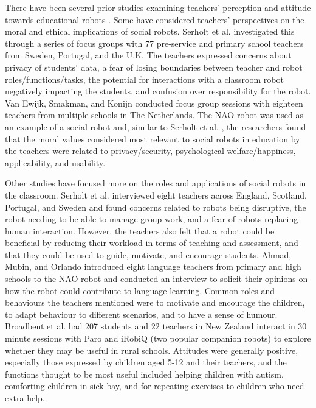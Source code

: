 There have been several prior studies examining teachers' perception and attitude towards educational robots \cite{serholt2014teachers,Broadbent2018,Serholt2017,van2020teachers,Westlund2016,Ahmad2016,chang10}. Some have considered teachers' perspectives on the moral and ethical implications of social robots. Serholt et al. \cite{Serholt2017} investigated this through a series of focus groups with 77 pre-service and primary school teachers from Sweden, Portugal, and the U.K. The teachers expressed concerns about privacy of students' data, a fear of losing boundaries between teacher and robot roles/functions/tasks, the potential for interactions with a classroom robot negatively impacting the students, and confusion over responsibility for the robot. Van Ewijk, Smakman, and Konijn \cite{van2020teachers} conducted focus group sessions with eighteen teachers from multiple schools in The Netherlands. The NAO robot was used as an example of a social robot and, similar to Serholt et al. \cite{Serholt2017}, the researchers found that the moral values considered most relevant to social robots in education by the teachers were related to privacy/security, psychological welfare/happiness, applicability, and usability. 

Other studies have focused more on the roles and applications of social robots in the classroom. Serholt et al. \cite{serholt2014teachers} interviewed eight teachers across England, Scotland, Portugal, and Sweden and found concerns related to robots being disruptive, the robot needing to be able to manage group work, and a fear of robots replacing human interaction. However, the teachers also felt that a robot could be beneficial by reducing their workload in terms of teaching and assessment, and that they could be used to guide, motivate, and encourage students. Ahmad, Mubin, and Orlando \cite{Ahmad2016} introduced eight language teachers from primary and high schools to the NAO robot and conducted an interview to solicit their opinions on how the robot could contribute to language learning. Common roles and behaviours the teachers mentioned were to motivate and encourage the children, to adapt behaviour to different scenarios, and to have a sense of humour. Broadbent et al. \cite{Broadbent2018} had 207 students and 22 teachers in New Zealand interact in 30 minute sessions with Paro and iRobiQ (two popular companion robots) to explore whether they may be useful in rural schools. Attitudes were generally positive, especially those expressed by children aged 5-12 and their teachers, and the functions thought to be most useful included helping children with autism, comforting children in sick bay, and for repeating exercises to children who need extra help. 

